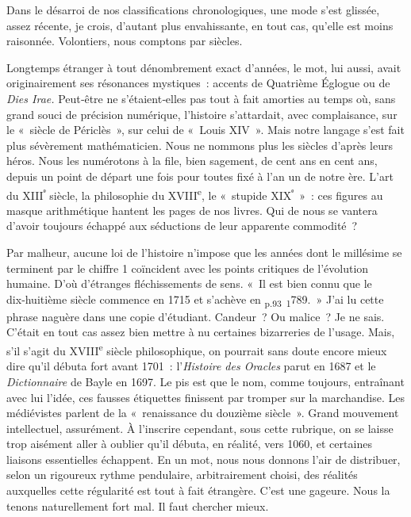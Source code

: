 \documentclass[french,twoside]{book} %
\begin{document}
\noindent Dans le désarroi de nos classifications chronologiques, une mode s’est glissée, assez récente, je crois, d’autant plus envahissante, en tout cas, qu’elle est moins raisonnée. Volontiers, nous comptons par siècles.\par
Longtemps étranger à tout dénombrement exact d’années, le mot, lui aussi, avait originairement ses résonances mystiques : accents de Qua­trième Églogue ou de \emph{Dies Irae.} Peut‑être ne s’étaient‑elles pas tout à fait amorties au temps où, sans grand souci de précision numérique, l’histoire s’attardait, avec complaisance, sur le « siècle de Périclès », sur celu­i de « Louis XIV ». Mais notre langage s’est fait plus sévèrement mathéma­ticien. Nous ne nommons plus les siècles d’après leurs héros. Nous les numérotons à la file, bien sagement, de cent ans en cent ans, depuis un point de départ une fois pour toutes fixé à l’an un de notre ère. L’art du XIII\textsuperscript{ᵉ} siècle, la philosophie du XVIII\textsuperscript{e}, le « stupide XIX\textsuperscript{ᵉ} » : ces figures au masque arithmétique hantent les pages de nos livres. Qui de nous se vantera d’avoir toujours échappé aux séductions de leur apparente com­modité ?\par
Par malheur, aucune loi de l’histoire n’impose que les années dont le millésime se terminent par le chiffre 1 coïncident avec les points critiques de l’évolution humaine. D’où d’étranges fléchissements de sens. « Il est bien connu que le dix‑huitième siècle commence en 1715 et s’achève en \textsubscript{p.93 1}789. » J’ai lu cette phrase naguère dans une copie d’étudiant. Candeur ? Ou malice ? Je ne sais. C’était en tout cas assez bien mettre à nu cer­taines bizarreries de l’usage. Mais, s’il s’agit du XVIII\textsuperscript{e} siècle philoso­phique, on pourrait sans doute encore mieux dire qu’il débuta fort avant 1701 : l’\emph{Histoire des Oracles} parut en 1687 et le \emph{Dictionnaire} de Bayle en 1697. Le pis est que le nom, comme toujours, entraînant avec lui l’idée, ces fausses étiquettes finissent par tromper sur la marchandise. Les médié­vistes parlent de la « renaissance du douzième siècle ». Grand mouvement intellectuel, assurément. À l’inscrire cependant, sous cette rubrique, on se laisse trop aisément aller à oublier qu’il débuta, en réalité, vers 1060, et certaines liaisons essentielles échappent. En un mot, nous nous donnons l’air de distribuer, selon un rigoureux rythme pendulaire, arbitrairement choisi, des réalités auxquelles cette régularité est tout à fait étrangère. C’est une gageure. Nous la tenons naturellement fort mal. Il faut chercher mieux.\par
\end{document}

